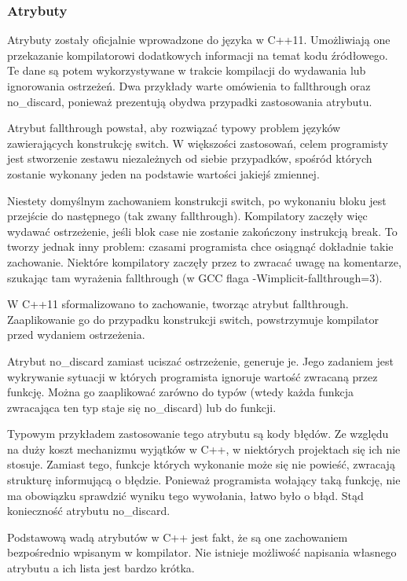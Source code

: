 \documentclass[conference]{IEEEtran}
\begin{document}
\subsubsection{Atrybuty}
Atrybuty zostały oficjalnie wprowadzone do języka w C++11. Umożliwiają one przekazanie kompilatorowi dodatkowych informacji na temat kodu źródłowego. Te dane są potem wykorzystywane w trakcie kompilacji do wydawania lub ignorowania ostrzeżeń. Dwa przykłady warte omówienia to fallthrough oraz no\_discard, ponieważ prezentują obydwa przypadki zastosowania atrybutu.\par
Atrybut fallthrough powstał, aby rozwiązać typowy problem języków zawierających konstrukcję switch. W większości zastosowań, celem programisty jest stworzenie zestawu niezależnych od siebie przypadków, spośród których zostanie wykonany jeden na podstawie wartości jakiejś zmiennej.\par
Niestety domyślnym zachowaniem konstrukcji switch, po wykonaniu bloku jest przejście do następnego (tak zwany fallthrough). Kompilatory zaczęły więc wydawać ostrzeżenie, jeśli blok case nie zostanie zakończony instrukcją break. To tworzy jednak inny problem: czasami programista chce osiągnąć dokładnie takie zachowanie. Niektóre kompilatory zaczęły przez to zwracać uwagę na komentarze, szukając tam wyrażenia fallthrough (w GCC flaga -Wimplicit-fallthrough=3).\par
W C++11 sformalizowano to zachowanie, tworząc atrybut fallthrough. Zaaplikowanie go do przypadku konstrukcji switch, powstrzymuje kompilator przed wydaniem ostrzeżenia.\par
Atrybut no\_discard zamiast uciszać ostrzeżenie, generuje je. Jego zadaniem jest wykrywanie sytuacji w których programista ignoruje wartość zwracaną przez funkcję. Można go zaaplikować zarówno do typów (wtedy każda funkcja zwracająca ten typ staje się no\_discard) lub do funkcji.\par
Typowym przykładem zastosowanie tego atrybutu są kody błędów. Ze względu na duży koszt mechanizmu wyjątków w C++, w niektórych projektach się ich nie stosuje. Zamiast tego, funkcje których wykonanie może się nie powieść, zwracają strukturę informującą o błędzie. Ponieważ programista wołający taką funkcję, nie ma obowiązku sprawdzić wyniku tego wywołania, łatwo było o błąd. Stąd konieczność atrybutu no\_discard.\par
Podstawową wadą atrybutów w C++ jest fakt, że są one zachowaniem bezpośrednio wpisanym w kompilator. Nie istnieje możliwość napisania własnego atrybutu a ich lista jest bardzo krótka.\par
\end{document}
